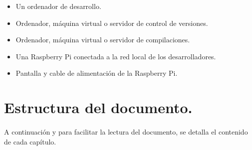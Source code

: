 \begin{itemize}
	\item Un ordenador de desarrollo.
	\item Ordenador, máquina virtual o servidor de control de versiones.
	\item Ordenador, máquina virtual o servidor de compilaciones.
	\item Una Raspberry Pi conectada a la red local de los desarrolladores.
	\item Pantalla y cable de alimentación de la Raspberry Pi.
\end{itemize}

\section{Estructura del documento.}

\paragraph{}A continuación y para facilitar la lectura del documento, se detalla el
contenido de cada capítulo.

